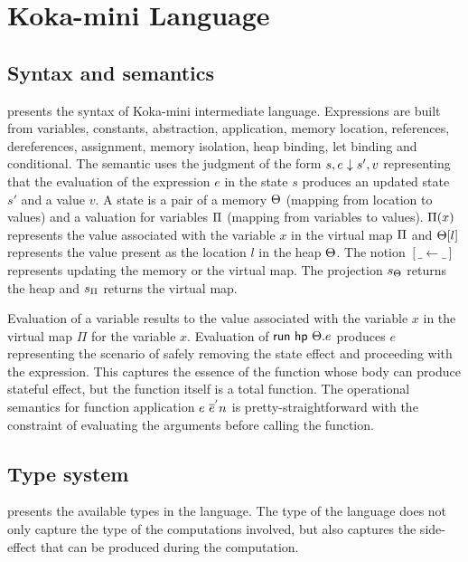 \section{Koka-mini Language}
\subsection{Syntax and semantics}

 presents the syntax of Koka-mini intermediate language. Expressions are built from variables, constants, abstraction, application, memory location, references, dereferences, assignment, memory isolation, heap binding, let binding and conditional. The semantic uses the judgment of the form $s,e \downarrow s',v$ representing that the evaluation of the expression $e$ in the state $s$ produces an updated state $s'$ and a value $v$.
A state is a pair of a memory $\Theta$ (mapping from location to values) and a valuation for variables $\Pi$ (mapping from variables to values). $\Pi(x)$ represents the value associated with the variable $x$ in the virtual map $\Pi$ and $\Theta[l]$ represents the value present as the location $l$ in the heap $\Theta$. The notion $[\_ \leftarrow \_]$ represents updating the memory or the virtual map. The projection $s_{\Theta}$ returns the heap and $s_{\Pi}$ returns the virtual map.

Evaluation of a variable results to the value associated with the variable $x$ in the virtual map $\Pi$ for the variable $x$. 
Evaluation of ${\mathsf{run}}\ {{\mathsf{hp}}\ {\Theta}.{e}}$ produces $e$ representing the scenario of safely removing the state effect and proceeding with the expression. This captures the essence of the function whose body can produce stateful effect, but the function itself is a total function.
The operational semantics for function application $e \ \overline{e}^{'} n$ is pretty-straightforward with the constraint of evaluating the arguments before calling the function.
\subsection{Type system}

 presents the available types in the language. The type of the language does not only capture the type of the computations involved, but also captures the side-effect that can be produced during the computation.

